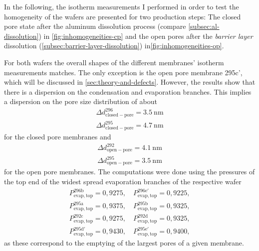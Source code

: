 \documentclass[../thesis.tex]{subfiles}
\begin{document}
        In the following, the isotherm measurements I performed in order to test the homogeneity of the wafers are presented for two production steps: The closed pore state after the aluminum dissolution process (compare \cref{subsec:al-dissolution}) in \cref{fig:inhomogeneities-cp} and the open pores after the \textit{barrier layer} dissolution (\cref{subsec:barrier-layer-dissolution}) in\cref{fig:inhomogeneities-op}.

        For both wafers the overall shapes of the different membranes' isotherm measurements matches. The only exception is the open pore membrane 295c', which will be discussed in \cref{sec:theory-and-defects}. However, the results show that there is a dispersion on the condensation and evaporation branches. This implies a dispersion on the pore size distribution of about
        \begin{align*}
          \Delta d_\mathrm{closed-pore}^\mathrm{296} = \SI{3,5}{\nano\meter} \\
          \Delta d_\mathrm{closed-pore}^\mathrm{295} = \SI{4,7}{\nano\meter}
        \end{align*}
        for the closed pore membranes and
        \begin{align*}
          \Delta d_\mathrm{open-pore}^\mathrm{292} = \SI{4,1}{\nano\meter} \\
          \Delta d_\mathrm{open-pore}^\mathrm{295} = \SI{3,5}{\nano\meter}
        \end{align*}
        for the open pore membranes. The computations were done using the pressures of the top end of the widest spread evaporation branches of the respective wafer
        \begin{align*}
          P_\mathrm{evap,top}^\mathrm{296b}=0,9275,\quad P_\mathrm{evap,top}^\mathrm{296e'}=0,9225, \\
          P_\mathrm{evap,top}^\mathrm{295a}=0,9375,\quad P_\mathrm{evap,top}^\mathrm{295b}=0,9325, \\
          P_\mathrm{evap,top}^\mathrm{292c}=0,9275,\quad P_\mathrm{evap,top}^\mathrm{292d}=0,9325, \\
          P_\mathrm{evap,top}^\mathrm{295d'}=0,9430,\quad P_\mathrm{evap,top}^\mathrm{295e'}=0,9400,
        \end{align*}
        as these correspond to the emptying of the largest pores of a given membrane.
        \medskip
\end{document}
